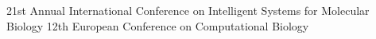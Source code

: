 
\colorbox{qmuldarkblue}
{
 \color{white}
 \parbox{1.0\textwidth}
 {

  \begin{center}
21st Annual International Conference on Intelligent Systems for Molecular Biology \hspace{2cm}
12th European Conference on Computational Biology
  \end{center}
 }
}
